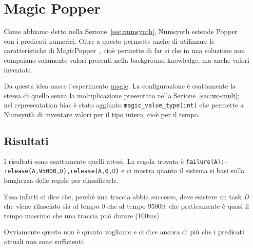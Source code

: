 \section{Magic Popper}
Come abbiamo detto nella Sezione~\ref{sec:numsynth}, Numsynth estende Popper con i predicati numerici. Oltre a questo permette anche di utilizzare le caratteristiche di MagicPopper~\cite{hocquette2023learning}, cioè permette di far si che in una soluzione non compaiano solamente valori presenti nella background knowledge, ma anche valori inventati.

Da questa idea nasce l'esperimento \href{https://github.com/edoardosarri24/numsynth/tree/main/my-experiments/5-magic/}{magic}. La configurazione è esattamente la stessa di quello senza la moltiplicazione presentato nella Sezione~\ref{sec:wo-mult}; nel representation bias è stato aggiunto \texttt{magic\_value\_type(int)} che permette a Numsynth di inventare valori per il tipo intero, cioè per il tempo.

\subsection{Risultati}
I risultati sono esattamente quelli attesi. La regola trovata è \texttt{failure(A):- \\ release(A,95000,D),release(A,0,D)} e ci mostra quanto il sistema si basi sulla lunghezza delle regole per classificarle.

Essa infatti ci dice che, perchè una traccia abbia successo, deve esistere un task \textit{D} che viene rilasciato sia al tempo 0 che al tempo 95000, che praticamente è quasi il tempo massimo che una traccia può durare (100ms).

Ovviamente questo non è quanto vogliamo e ci dice ancora di più che i predicati attuali non sono sufficienti.
